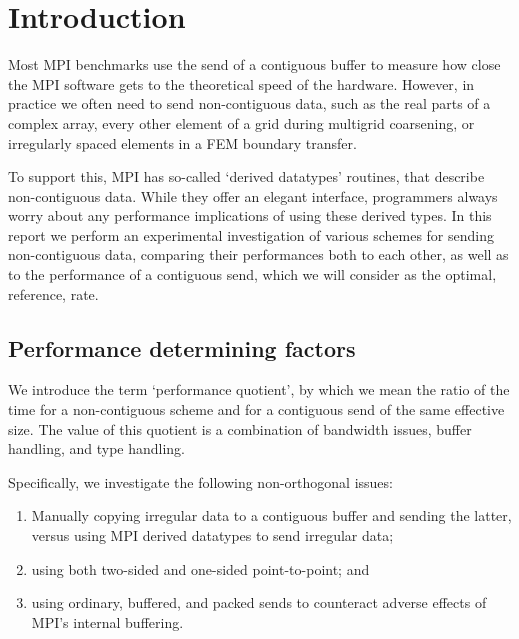 
\section{Introduction}

Most \ac{MPI} benchmarks use the send of a contiguous buffer to measure
how close the MPI software gets to the theoretical speed of the
hardware.
However, in practice we often need to send non-contiguous data, such
as the real parts of a complex array, every other element of a grid
during multigrid coarsening, or irregularly spaced elements in a
\ac{FEM} boundary transfer.

To support this, MPI has so-called `derived datatypes' routines, that
describe non-contiguous data. While they offer an elegant interface,
programmers always worry about any performance implications of using
these derived types. In this report we perform an experimental
investigation of  various schemes for sending non-contiguous
data, comparing their performances both to each other, as well as to
the performance of a contiguous send, which we will consider as the
optimal, reference, rate.

\subsection{Performance determining factors}

We introduce the term `performance quotient', by which we mean
the ratio of the time for a non-contiguous scheme and for a
contiguous send of the same effective size. The value of this quotient
is a combination of bandwidth issues, buffer handling, and type handling.

Specifically, we investigate the following non-orthogonal issues:
\begin{enumerate}
\item Manually copying irregular data to a contiguous buffer and
  sending the latter, versus using MPI derived datatypes to send irregular data;
\item using both two-sided and one-sided point-to-point; and
\item using ordinary, buffered, and packed sends to counteract adverse effects of
  MPI's internal buffering.
\end{enumerate}

